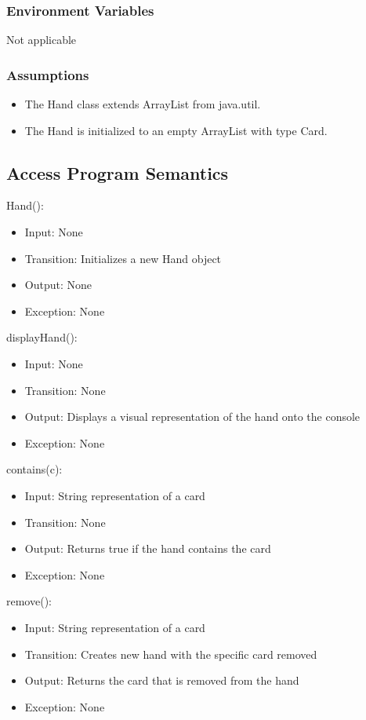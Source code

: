 \documentclass[12pt, titlepage]{article}
\begin{document}
\subsubsection{Environment Variables}
Not applicable

\subsubsection{Assumptions}
\begin{itemize}
    \item The Hand class extends ArrayList from java.util.
    \item The Hand is initialized to an empty ArrayList with type Card.
\end{itemize}

\subsection{Access Program Semantics}
\noindent Hand():
\begin{itemize}
    \item Input: None 
    \item Transition: Initializes a new Hand object 
    \item Output: None 
    \item Exception: None
\end{itemize}

\noindent displayHand():
\begin{itemize}
    \item Input: None 
    \item Transition: None
    \item Output: Displays a visual representation of the hand onto the console
    \item Exception: None
\end{itemize}

\noindent contains(c):
\begin{itemize}
    \item Input: String representation of a card 
    \item Transition: None 
    \item Output: Returns true if the hand contains the card
    \item Exception: None
\end{itemize}

\noindent remove():
\begin{itemize}
    \item Input: String representation of a card 
    \item Transition: Creates new hand with the specific card removed
    \item Output: Returns the card that is removed from the hand
    \item Exception: None
\end{itemize}
\end{document}
